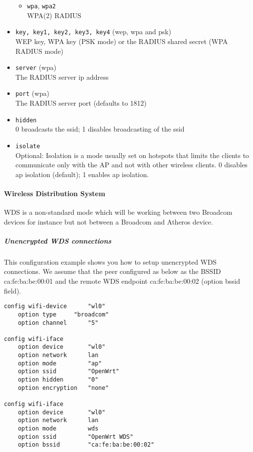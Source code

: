 \begin{itemize}
\begin{itemize}
            \item \texttt{wpa}, \texttt{wpa2} \\
                WPA(2) RADIUS
        \end{itemize}

    \item \texttt{key, key1, key2, key3, key4} (wep, wpa and psk) \\
        WEP key, WPA key (PSK mode) or the RADIUS shared secret (WPA RADIUS mode)

    \item \texttt{server} (wpa) \\
        The RADIUS server ip address

    \item \texttt{port} (wpa) \\
        The RADIUS server port (defaults to 1812)

    \item \texttt{hidden} \\
        0 broadcasts the ssid; 1 disables broadcasting of the ssid

    \item \texttt{isolate} \\
        Optional: Isolation is a mode usually set on hotspots that limits the clients to communicate only with the AP and not with other wireless clients.
        0 disables ap isolation (default); 1 enables ap isolation.

\end{itemize}

\paragraph{Wireless Distribution System}

WDS is a non-standard mode which will be working between two Broadcom devices for instance
but not between a Broadcom and Atheros device.

\subparagraph{Unencrypted WDS connections}

This configuration example shows you how to setup unencrypted WDS connections.
We assume that the peer configured as below as the BSSID ca:fe:ba:be:00:01
and the remote WDS endpoint ca:fe:ba:be:00:02 (option bssid field).

\begin{Verbatim}
config wifi-device      "wl0"
    option type		"broadcom"
    option channel      "5"

config wifi-iface
    option device       "wl0"
    option network  	lan
    option mode         "ap"
    option ssid         "OpenWrt"
    option hidden       "0"
    option encryption   "none"

config wifi-iface
    option device       "wl0"
    option network      lan
    option mode         wds
    option ssid         "OpenWrt WDS"
    option bssid        "ca:fe:ba:be:00:02"
\end{Verbatim}

